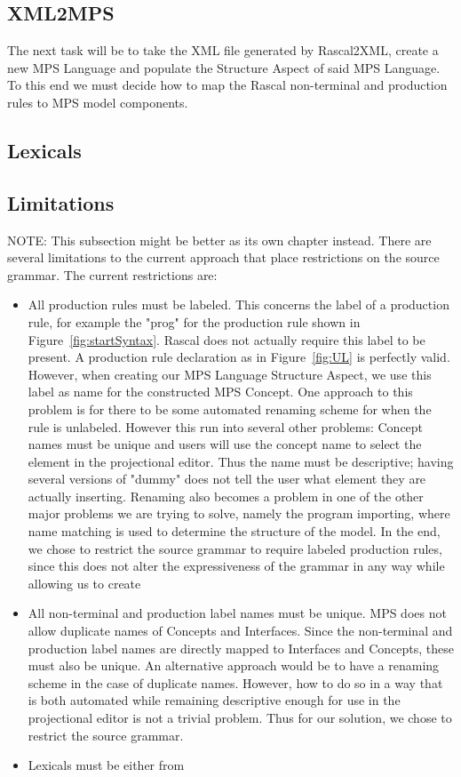 \documentclass[a4paper, 11pt]{article}
\begin{document}
\subsection{XML2MPS}
The next task will be to take the XML file generated by Rascal2XML, create a new MPS Language and populate the Structure Aspect of said MPS Language. To this end we must decide how to map the Rascal non-terminal and production rules to MPS model components. 
\subsection{Lexicals}
\subsection{Limitations}
NOTE: This subsection might be better as its own chapter instead.
There are several limitations to the current approach that place restrictions on the source grammar. 
The current restrictions are:

\begin{itemize}
	\item All production rules must be labeled. This concerns the label of a production rule, for example the "prog" for the production rule shown in Figure~\ref{fig:startSyntax}. Rascal does not actually require this label to be present. A production rule declaration as in Figure~\ref{fig:UL} is perfectly valid. However, when creating our MPS Language Structure Aspect, we use this label as name for the constructed MPS Concept. One approach to this problem is for there to be some automated renaming scheme for when the rule is unlabeled. However this run into several other problems: Concept names must be unique and users will use the concept name to select the element in the projectional editor. Thus the name must be descriptive; having several versions of "dummy" does not tell the user what element they are actually inserting. Renaming also becomes a problem in one of the other major problems we are trying to solve, namely the program importing, where name matching is used to determine the structure of the model. In the end, we chose to restrict the source grammar to require labeled production rules, since this does not alter the expressiveness of the grammar in any way while allowing us to create 
	\item All non-terminal and production label names must be unique. MPS does not allow duplicate names of Concepts and Interfaces. Since the non-terminal and production label names are directly mapped to Interfaces and Concepts, these must also be unique. An alternative approach would be to have a renaming scheme in the case of duplicate names. However, how to do so  in a way that is both automated while remaining descriptive enough for use in the projectional editor is not a trivial problem. Thus for our solution, we chose to restrict the source grammar.  
	\item Lexicals must be either from 
	
\end{itemize}
\end{document}
